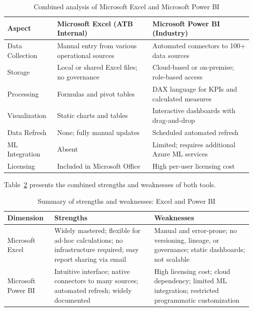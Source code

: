 \begin{table}[H]
\centering
\small
\renewcommand{\arraystretch}{1.3}
\caption{Combined analysis of Microsoft Excel and Microsoft Power BI}
\label{tab:combined_analyse}
\begin{tabular}{|p{3.5cm}|p{5.2cm}|p{5.2cm}|}
\hline
\rowcolor{blue!15}
\textbf{Aspect} & \textbf{Microsoft Excel (ATB Internal)} & \textbf{Microsoft Power BI (Industry)} \\ \hline
Data Collection & Manual entry from various operational sources & Automated connectors to 100+ data sources \\ \hline
Storage & Local or shared Excel files; no governance & Cloud-based or on-premise; role-based access \\ \hline
Processing & Formulas and pivot tables & DAX language for KPIs and calculated measures \\ \hline
Visualization & Static charts and tables & Interactive dashboards with drag-and-drop \\ \hline
Data Refresh & None; fully manual updates & Scheduled automated refresh \\ \hline
ML Integration & Absent & Limited; requires additional Azure ML services \\ \hline
Licensing & Included in Microsoft Office & High per-user licensing cost \\ \hline
\end{tabular}
\end{table}

Table~\ref{tab:combined_synthese} presents the combined strengths and weaknesses of both tools.

\begin{table}[H]
\centering
\small
\renewcommand{\arraystretch}{1.3}
\caption{Summary of strengths and weaknesses: Excel and Power BI}
\label{tab:combined_synthese}
\begin{tabular}{|p{3.5cm}|p{5.2cm}|p{5.2cm}|}
\hline
\rowcolor{blue!15}
\textbf{Dimension} & \textbf{Strengths} & \textbf{Weaknesses} \\ \hline
Microsoft Excel &
  Widely mastered; flexible for ad-hoc calculations; no infrastructure required; easy report sharing via email &
  Manual and error-prone; no versioning, lineage, or governance; static dashboards; not scalable \\ \hline
Microsoft Power BI &
  Intuitive interface; native connectors to many sources; automated refresh; widely documented &
  High licensing cost; cloud dependency; limited ML integration; restricted programmatic customization \\ \hline
\end{tabular}
\end{table}
\FloatBarrier

